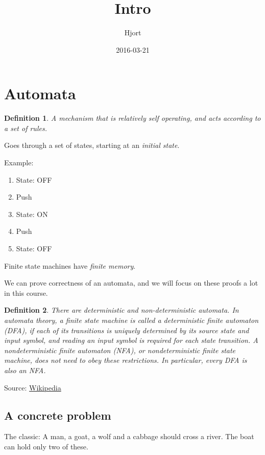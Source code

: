 \documentclass{article}
\title{Intro}
\date{2016-03-21}
\author{Hjort}
\newtheorem{definition}{Definition}[section]
\begin{document}
\maketitle
{}

\section{Automata}

\begin{definition}
    A mechanism that is relatively self operating, and acts according to a set of rules.
\end{definition}

Goes through a set of states, starting at an \textit{initial state}.

Example:

\begin{enumerate}
    \item State: OFF
    \item Push
    \item State: ON
    \item Push
    \item State: OFF
\end{enumerate}

Finite state machines have \textit{finite memory}.

We can prove correctness of an automata, and we will focus on these proofs a
lot in this course.

\begin{definition}
    There are deterministic and non-deterministic automata.
    In automata theory, a finite state machine is called a deterministic finite automaton (DFA), if
    each of its transitions is uniquely determined by its source state and input symbol, and
    reading an input symbol is required for each state transition.
    A nondeterministic finite automaton (NFA), or nondeterministic finite state machine, does not need to obey these restrictions. In particular, every DFA is also an NFA.
\end{definition}
Source: \href{https://en.wikipedia.org/wiki/Nondeterministic_finite_automaton}{Wikipedia}

\subsection{A concrete problem}

The classic: A man, a goat, a wolf and a cabbage should cross a river. The boat can hold only two of these.
\end{document}
